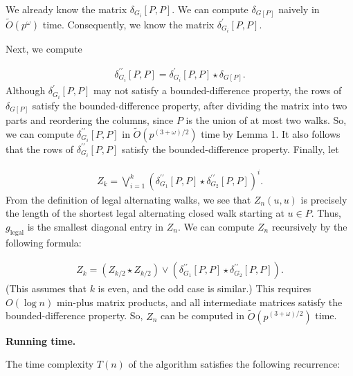\documentclass[10pt,a4paper]{article}
\begin{document}
We already know the matrix $\delta_{G_{i}}[P,P]$. We can compute $\delta_{G[P]}$ naively in $\widetilde{O}(p^{\omega})$ time. Consequently, we know the matrix $\delta^{\prime}_{G_{i}}[P,P]$.
\par
\par
Next, we compute
\par
\[\begin{aligned}
\delta^{\prime\prime}_{G_{i}}[P,P]=\delta^{\prime}_{G_{i}}[P,P]\star\delta_{G[%
P]}.
\end{aligned}\]
Although $\delta^{\prime}_{G_{i}}[P,P]$ may not satisfy a bounded-difference property, the rows of $\delta_{G[P]}$ satisfy the bounded-difference property, after dividing the matrix into two parts and reordering the columns, since $P$ is the union of at most two walks. So, we can compute $\delta^{\prime\prime}_{G_{i}}[P,P]$ in $\widetilde{O}(p^{(3+\omega)/2})$ time by Lemma 1. It also follows that the rows of $\delta^{\prime\prime}_{G_{i}}[P,P]$ satisfy the bounded-difference property. Finally, let
\par
\[\begin{aligned}
Z_{k}=\bigvee_{i=1}^{k}(\delta^{\prime\prime}_{G_{1}}[P,P]\star\delta^{\prime%
\prime}_{G_{2}}[P,P])^{i}.
\end{aligned}\]
From the definition of legal alternating walks, we see that $Z_{n}(u,u)$ is precisely the length of the shortest legal alternating closed walk starting at $u\in P$. Thus, $g_{\textrm{legal}}$ is the smallest diagonal entry in $Z_{n}$. We can compute $Z_{n}$ recursively by the following formula:
\par
\[\begin{aligned}
Z_{k}=(Z_{k/2}\star Z_{k/2})\vee(\delta^{\prime\prime}_{G_{1}}[P,P]\star\delta%
^{\prime\prime}_{G_{2}}[P,P]).
\end{aligned}\]
(This assumes that $k$ is even, and the odd case is similar.) This requires $O(\log n)$ min-plus matrix products, and all intermediate matrices satisfy the bounded-difference property. So, $Z_{n}$ can be computed in $\widetilde{O}(p^{(3+\omega)/2})$ time.
\par
\par
\par\medskip\noindent\textbf{Running time.}\par
The time complexity $T(n)$ of the algorithm satisfies the following recurrence:
\end{document}

